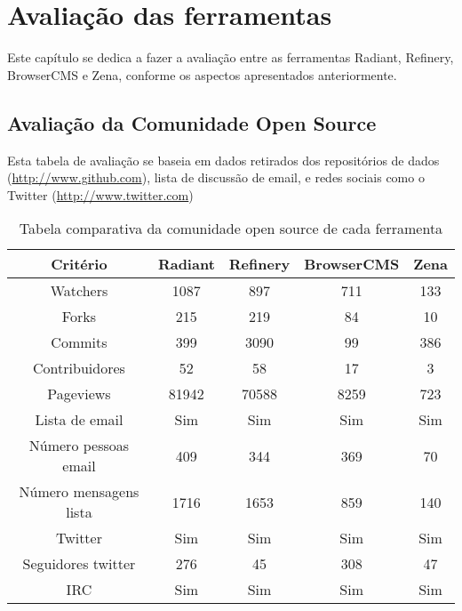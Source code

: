 \chapter{Avaliação das ferramentas}

Este capítulo se dedica a fazer a avaliação entre as ferramentas Radiant, Refinery, BrowserCMS e Zena, conforme os aspectos apresentados anteriormente.

\section{Avaliação da Comunidade Open Source}

Esta tabela de avaliação se baseia em dados retirados dos repositórios de dados (\url{http://www.github.com}), lista de discussão de email, e redes sociais como o Twitter (\url{http://www.twitter.com})

\begin{table}[ht]
\caption{Tabela comparativa da comunidade open source de cada ferramenta } %
\centering %
\begin{tabular}{c c c c c} %
\hline\hline %
Critério & Radiant & Refinery & BrowserCMS & Zena \\ [0.5ex] %
\hline %
Watchers               & 1087  & 897   & 711  & 133  \\ %
Forks                  & 215   & 219   & 84   & 10   \\
Commits                & 399   & 3090  & 99   & 386  \\
Contribuidores         & 52    & 58    & 17   & 3    \\ 
Pageviews              & 81942 & 70588 & 8259 & 723  \\ 
Lista de email         & Sim   & Sim   & Sim  & Sim  \\ 
Número pessoas email   & 409   & 344   & 369  & 70   \\ 
Número mensagens lista & 1716  & 1653  & 859  & 140  \\ 
Twitter                & Sim   & Sim   & Sim  & Sim  \\ 
Seguidores twitter     & 276   & 45    & 308  & 47   \\ 
IRC                    & Sim   & Sim   & Sim  & Sim  \\ [1ex] %
\hline %
\end{tabular}
\label{table:nonlin} %
\end{table}

